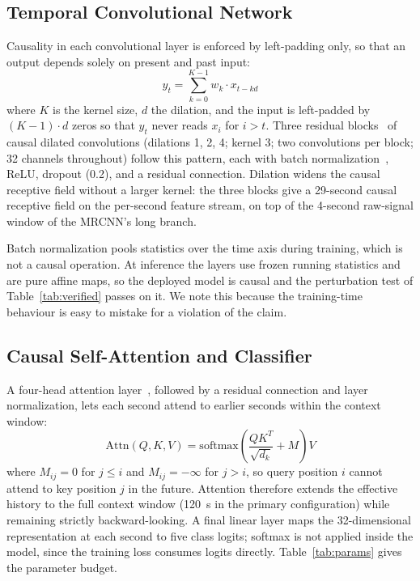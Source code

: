 \documentclass[conference]{IEEEtran}
\begin{document}
\subsection{Temporal Convolutional Network}

Causality in each convolutional layer is enforced by left-padding only, so that an output depends
solely on present and past input:
\begin{equation}
y_t = \sum_{k=0}^{K-1} w_k \cdot x_{t-kd}
\end{equation}
where $K$ is the kernel size, $d$ the dilation, and the input is left-padded by $(K-1)\cdot d$
zeros so that $y_t$ never reads $x_i$ for $i > t$. Three residual blocks~\cite{resnet} of causal
dilated convolutions (dilations 1, 2, 4; kernel 3; two convolutions per block; 32 channels
throughout) follow this pattern, each with batch normalization~\cite{batchnorm}, ReLU, dropout
(0.2), and a residual connection. Dilation widens the causal receptive field without a larger
kernel: the three blocks give a 29-second causal receptive field on the per-second feature stream,
on top of the 4-second raw-signal window of the MRCNN's long branch.

Batch normalization pools statistics over the time axis during training, which is not a causal
operation. At inference the layers use frozen running statistics and are pure affine maps, so the
deployed model is causal and the perturbation test of Table~\ref{tab:verified} passes on it. We
note this because the training-time behaviour is easy to mistake for a violation of the claim.

\subsection{Causal Self-Attention and Classifier}

A four-head attention layer~\cite{attention}, followed by a residual connection and layer
normalization, lets each second attend to earlier seconds within the context window:
\begin{equation}
\mathrm{Attn}(Q,K,V) = \mathrm{softmax}\!\left(\frac{QK^{T}}{\sqrt{d_k}} + M\right)V
\end{equation}
where $M_{ij} = 0$ for $j \leq i$ and $M_{ij} = -\infty$ for $j > i$, so query position $i$ cannot
attend to key position $j$ in the future. Attention therefore extends the effective history to the
full context window (120~s in the primary configuration) while remaining strictly backward-looking.
A final linear layer maps the 32-dimensional representation at each second to five class logits;
softmax is not applied inside the model, since the training loss consumes logits directly.
Table~\ref{tab:params} gives the parameter budget.
\end{document}
